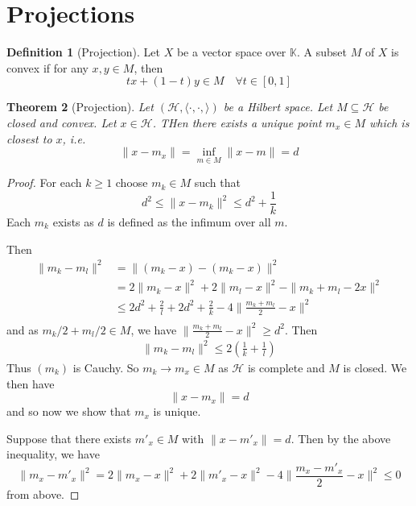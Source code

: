 \documentclass[10pt, oneside, reqno]{amsbook}
\theoremstyle{plain}%
\newtheorem{thm}{Theorem}[section]
\theoremstyle{definition}
\newtheorem{defn}[thm]{Definition}
\theoremstyle{remark}
\newcommand{\K}{\mathbb{K}}
\newcommand{\Hil}{\mathcal{H}}
\begin{document}
\section{Projections} %
\label{sec:projection_operators}

\begin{defn}[Projection]
    Let $X$ be a vector space over $\K$.  A subset $M$ of $X$ is convex if for any $x, y \in M$, then \[
        tx + (1-t) y \in M \quad \forall t \in [0,1]
    \]
\end{defn}

\begin{thm}[Projection]
    Let $(\Hil, \langle \cdot, \cdot, \rangle )$ be a Hilbert space.  Let $M \subseteq \Hil$ be closed and convex.  Let $x \in \Hil$.  THen there exists a unique point $m_x \in M$ which is closest to $x$, i.e. \[
        \| x - m_x \| = \inf_{m \in M} \| x - m \| = d
    \]  
\end{thm}

\begin{proof}
    For each $k \geq 1$ choose $m_k \in M$ such that \[
        d^2 \leq \| x - m_k \|^2 \leq d^2 + \frac{1}{k} 
    \] Each $m_k$ exists as $d$ is defined as the infimum over all $m$. 
    
    Then \begin{align*}
        \| m_k - m_l \|^2   &= \| (m_k - x) - (m_k - x) \|^2 \\
                            &= 2 \| m_k - x \|^2 + 2 \| m_l - x \|^2 - \| m_k + m_l - 2x \|^2 \\
                            &\leq 2d^2 + \frac{2}{l} + 2d^2 + \frac{2}{k} - 4 \| \frac{ m_k + m_l}{2} - x \|^2 \\
    \end{align*} and as $m_k/2 + m_l/2 \in M$, we have $\| \frac{ m_k + m_l}{2} - x \|^2  \geq d^2$.  Then 
    \begin{align*}
            \| m_k - m_l \|^2 \leq 2 ( \frac{1}{k} + \frac{1}{l})
    \end{align*} Thus $(m_k)$ is Cauchy.  So $m_k \rightarrow m_x \in M$ as $\Hil$ is complete and $M$ is closed.  We then have \[
        \| x - m_x \| = d 
    \] and so now we show that $m_x$ is unique.  
    
    Suppose that there exists $m'_x \in M$ with $\| x - m'_x \| = d$.  Then by the above inequality, we have \[
        \| m_x - m'_x \|^2 = 2 \| m_x - x \|^2 + 2 \| m'_x - x \|^2 - 4 \| \frac{m_x - m'_x}{2} - x \|^2 \leq 0 
    \] from above. 
\end{proof}
\end{document}
